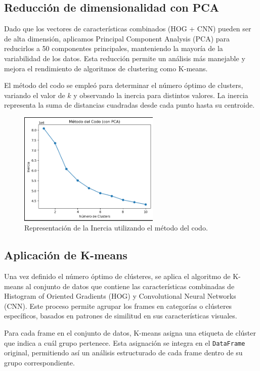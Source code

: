 \subsection{Reducción de dimensionalidad con PCA}
Dado que los vectores de características combinados (HOG + CNN) pueden ser de alta dimensión, aplicamos Principal Component Analysis (PCA) para reducirlos a 50 componentes principales, manteniendo la mayoría de la variabilidad de los datos. Esta reducción permite un análisis más manejable y mejora el rendimiento de algoritmos de clustering como K-means.

El método del codo se empleó para determinar el número óptimo de clusters, variando el valor de \( k \) y observando la inercia para distintos valores. La inercia representa la suma de distancias cuadradas desde cada punto hasta su centroide. 


\begin{figure}[H]
    \centering
    \includegraphics[width=0.60\textwidth]{4/figures/Modelo_4.png}
    \caption{Representación de la Inercia utilizando el método del codo.}
    \label{fig:convolucion}
\end{figure}


\subsection{Aplicación de K-means}

Una vez definido el número óptimo de clústeres, se aplica el algoritmo de K-means al conjunto de datos que contiene las características combinadas de Histogram of Oriented Gradients (HOG) y Convolutional Neural Networks (CNN). Este proceso permite agrupar los frames en categorías o clústeres específicos, basados en patrones de similitud en sus características visuales.

Para cada frame en el conjunto de datos, K-means asigna una etiqueta de clúster que indica a cuál grupo pertenece. Esta asignación se integra en el \texttt{DataFrame} original, permitiendo así un análisis estructurado de cada frame dentro de su grupo correspondiente.

